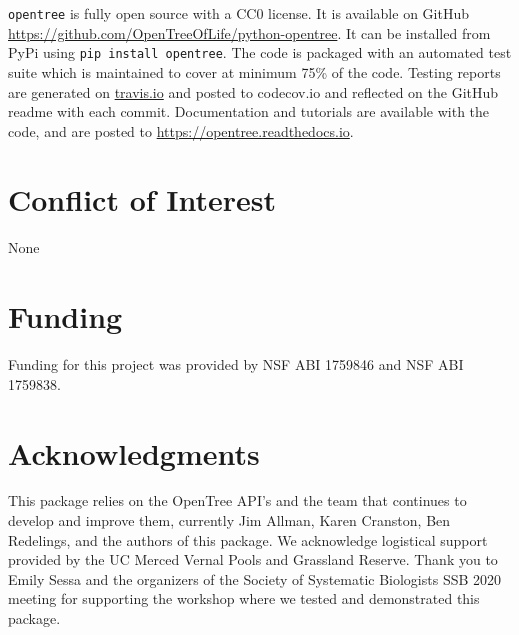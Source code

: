 \documentclass[oupdraft]{sysbio_sse}
\begin{document}
\texttt{opentree} is fully open source with a CC0 license. It is available on GitHub \url{ https://github.com/OpenTreeOfLife/python-opentree}. It can be installed from PyPi using \texttt{pip install opentree}. The code is packaged with an automated test suite which is maintained to cover at minimum 75\% of the code. Testing reports are generated on \url{travis.io} and posted to {codecov.io} and reflected on the GitHub readme with each commit. Documentation and tutorials are available with the code, and are posted to \url{https://opentree.readthedocs.io}.


\section{Conflict of Interest}
None

\section{Funding}
Funding for this project was provided by NSF ABI 1759846 and NSF ABI 1759838.

\section{Acknowledgments}
This package relies on the OpenTree API's and the team that continues to develop and improve them, currently Jim Allman, Karen Cranston, Ben Redelings, and the authors of this package. We acknowledge logistical support provided by the UC Merced Vernal Pools and Grassland Reserve.
Thank you to Emily Sessa and the organizers of the Society of Systematic Biologists SSB 2020 meeting for supporting the workshop where we tested and demonstrated this package.


\bigskip\bigskip



\end{document}
